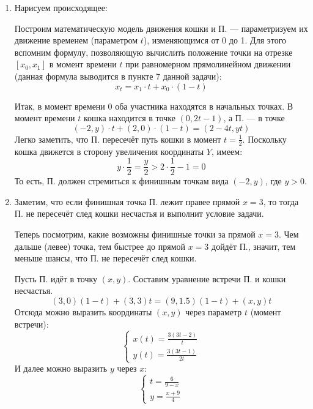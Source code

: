 
\begin{enumerate}
\item Нарисуем происходящее:

\begin{center}\end{center}

Построим математическую модель движения кошки и П. --- параметризуем
их движение временем (параметром $t$), изменяющимся от 0 до 1.
Для этого вспомним формулу, позволяющую вычислить положение точки на отрезке
$[x_0,x_1]$ в момент времени $t$ при равномерном прямолинейном движении (данная
формула выводится в пункте 7 данной задачи):
$$x_t = x_1 \cdot t + x_0 \cdot (1-t)$$

Итак, в момент времени 0 оба участника находятся в начальных точках.
В момент времени $t$ кошка находится в точке $(0,2t-1)$,
а П. --- в точке $$(-2,y)\cdot t + (2,0)\cdot (1-t) = (2-4t,yt)$$
Легко заметить, что П. пересечёт путь кошки в момент $t=\frac{1}{2}$.
Поскольку кошка движется в сторону увеличения координаты $Y$, имеем:
$$y\cdot\frac{1}{2} = \frac{y}{2} > 2\cdot\frac{1}{2} -1 = 0$$
То есть, П. должен стремиться к финишным точкам вида $(-2,y)$, где $y > 0$.

\item 

Заметим, что если финишная точка П. лежит правее прямой $x=3$,
то тогда П. не пересечёт след кошки несчастья и выполнит условие
задачи. 

Теперь посмотрим, какие возможны финишные точки за прямой $x=3$.
Чем дальше (левее) точка, тем быстрее до прямой $x=3$ дойдёт П.,
значит, тем меньше шансы, что П. не пересечёт след кошки.

Пусть П. идёт в точку $(x,y)$. Составим уравнение встречи П.
и кошки несчастья. 
$$(3,0)(1-t) + (3,3)t = (9,1.5)(1-t) + (x,y)t$$
Отсюда можно выразить координаты $(x,y)$ через параметр $t$
(момент встречи):
$$\left\{\begin{array}{l}x(t) = \frac{3(3t-2)}{t}\\y(t)=\frac{3(3t-1)}{2t}\end{array}\right.$$
И далее можно выразить $y$ через $x$:
$$\left\{\begin{array}{l}t = \frac{6}{9-x}\\y=\frac{x+9}{4}\end{array}\right.$$


\end{enumerate}
